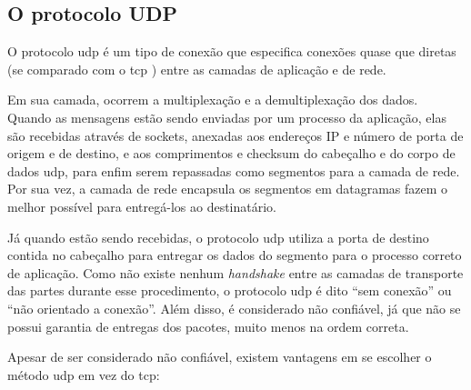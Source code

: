 
\subsection*{O protocolo UDP}

O protocolo \gls*{udp} é um tipo de conexão que especifica conexões quase que diretas
(se comparado com o \gls*{tcp} ) entre as camadas de aplicação e de
rede.

Em sua camada, ocorrem a multiplexação e a demultiplexação dos dados. Quando as
mensagens estão sendo enviadas por um processo da aplicação, elas são recebidas através
de \glspl{socket}, anexadas aos endereços IP e número de porta de origem e de destino, e
aos comprimentos e \gls{checksum} do cabeçalho e do corpo de dados \gls*{udp}, para
enfim serem repassadas como segmentos para a camada de rede. Por sua vez, a camada de
rede encapsula os segmentos em datagramas fazem o melhor possível para entregá-los ao
destinatário.

Já quando estão sendo recebidas, o protocolo \gls*{udp} utiliza a porta de destino
contida no cabeçalho para entregar os dados do segmento para o processo correto de
aplicação. Como não existe nenhum \emph{handshake} entre as camadas de transporte das
partes durante esse procedimento, o protocolo \gls*{udp} é dito ``sem conexão'' ou ``não
orientado a conexão''. Além disso, é considerado não confiável, já que não se possui
garantia de entregas dos pacotes, muito menos na ordem correta.

Apesar de ser considerado não confiável, existem vantagens em se escolher o método
\gls*{udp} em vez do \gls*{tcp}:

